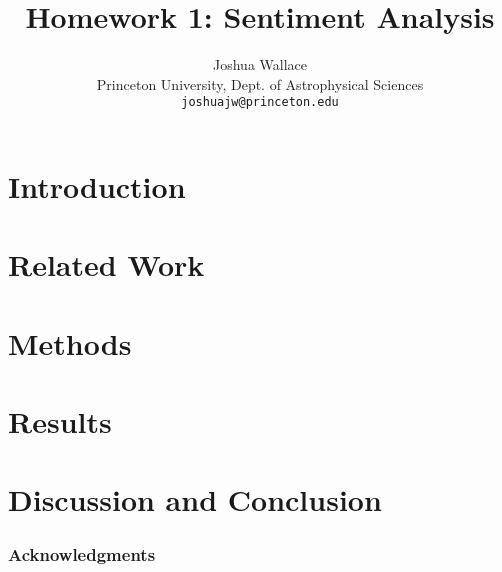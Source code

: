 \documentclass{article} %
\title{Homework 1: Sentiment Analysis}
\author{
Joshua Wallace\\
Princeton University, Dept. of Astrophysical Sciences\\
\texttt{joshuajw@princeton.edu} \\
}
\begin{document}
\maketitle

\begin{abstract}

\end{abstract}

\section{Introduction}



\section{Related Work}


\section{Methods}




\section{Results}


\section{Discussion and Conclusion}


\subsubsection*{Acknowledgments}





\end{document}
